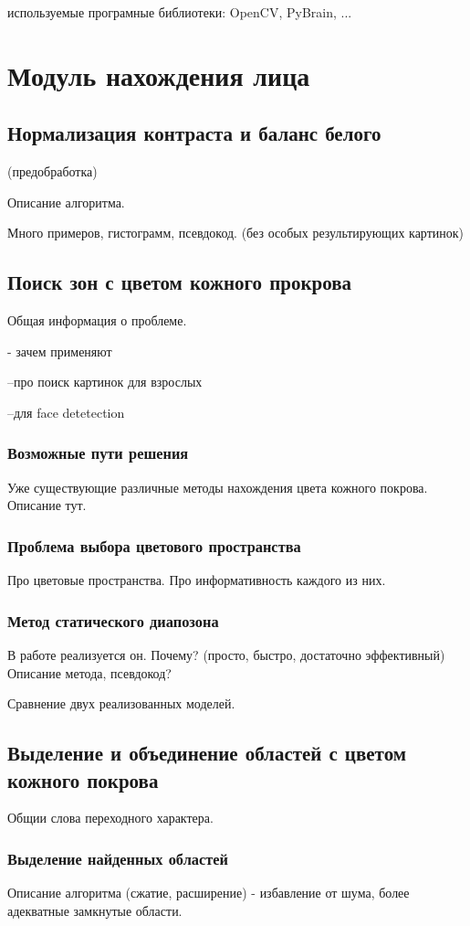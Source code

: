 \documentclass[12pt]{report}
\begin{document}
используемые програмные библиотеки: OpenCV, PyBrain, ...

\section{Модуль нахождения лица}

\subsection{Нормализация контраста и баланс белого}
(предобработка)

Описание алгоритма.

Много примеров, гистограмм, псевдокод. (без особых результирующих картинок)

\subsection{Поиск зон с цветом кожного прокрова}
Общая информация о проблеме.

- зачем применяют 

	--про поиск картинок для взрослых
	
	--для face detetection
\subsubsection{Возможные пути решения}
Уже существующие различные методы нахождения цвета кожного покрова. Описание тут.
\subsubsection{Проблема выбора цветового пространства}
Про цветовые пространства. Про информативность каждого из них.
\subsubsection{Метод статического диапозона}
В работе реализуется он. Почему? (просто, быстро, достаточно эффективный)
Описание метода, псевдокод?

Сравнение двух реализованных моделей.

\subsection{Выделение и объединение областей с цветом кожного покрова}
Общии слова переходного характера. 
\subsubsection{Выделение найденных областей}
Описание алгоритма (сжатие, расширение) -  избавление от шума, более адекватные замкнутые области.
\end{document}
